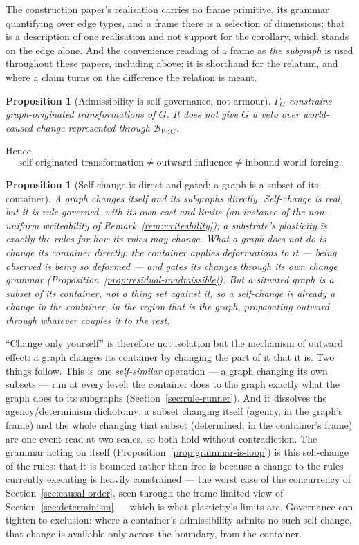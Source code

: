 \documentclass[11pt,a4paper]{article}
\newtheorem{proposition}[definition]{Proposition}
\theoremstyle{remark}\newtheorem{remark}[definition]{Remark}
\begin{document}
The construction paper's realisation carries no frame primitive, its grammar quantifying over edge types, and a frame there is a selection of dimensions; that is a description of one realisation and not support for the corollary, which stands on the edge alone. And the convenience reading of a frame as \emph{the subgraph} is used throughout these papers, including above; it is shorthand for the relatum, and where a claim turns on the difference the relation is meant.

\begin{proposition}[Admissibility is self-governance, not armour]\label{prop:self-governance}
$\Gamma_G$ constrains graph-originated transformations of $G$. It does not give $G$ a veto over world-caused change represented through $\mathcal B_{W:G}$.
\end{proposition}
Hence
\[\boxed{\text{self-originated transformation}\neq\text{outward influence}\neq\text{inbound world forcing}.}\]

\begin{proposition}[Self-change is direct and gated; a graph is a subset of its container]\label{prop:no-direct-self-alter}
A graph changes itself and its subgraphs directly. Self-change is real, but it is rule-governed, with its own cost and limits (an instance of the non-uniform writeability of Remark~\ref{rem:writeability}); a substrate's plasticity is exactly the rules for how its rules may change. What a graph does \emph{not} do is change its container directly: the container applies deformations to it --- being observed \emph{is} being so deformed --- and gates its changes through its own change grammar (Proposition~\ref{prop:residual-inadmissible}). But a situated graph is a \emph{subset} of its container, not a thing set against it, so a self-change is already a change in the container, in the region that is the graph, propagating outward through whatever couples it to the rest.
\end{proposition}
``Change only yourself'' is therefore not isolation but the mechanism of outward effect: a graph changes its container by changing the part of it that it is. Two things follow. This is one \emph{self-similar} operation --- a graph changing its own subsets --- run at every level: the container does to the graph exactly what the graph does to its subgraphs (Section~\ref{sec:rule-runner}). And it dissolves the agency/determinism dichotomy: a subset changing itself (agency, in the graph's frame) and the whole changing that subset (determined, in the container's frame) are one event read at two scales, so both hold without contradiction. The grammar acting on itself (Proposition~\ref{prop:grammar-is-loop}) is this self-change of the rules; that it is bounded rather than free is because a change to the rules currently executing is heavily constrained --- the worst case of the concurrency of Section~\ref{sec:causal-order}, seen through the frame-limited view of Section~\ref{sec:determinism} --- which is what plasticity's limits are. Governance can tighten to exclusion: where a container's admissibility admits no such self-change, that change is available only across the boundary, from the container.
\end{document}
